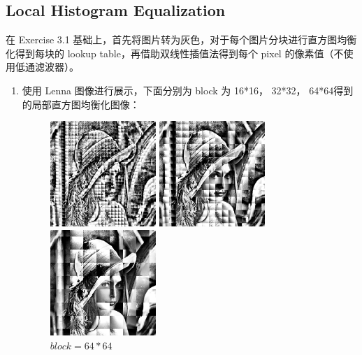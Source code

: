 \documentclass[a4paper,UTF8]{article}
\numberwithin{equation}{section}
\begin{document}
\subsection{Local Histogram Equalization}
\qquad 在 Exercise 3.1 基础上，首先将图片转为灰色，对于每个图片分块进行直方图均衡化得到每块的 lookup table，再借助双线性插值法得到每个 pixel 的像素值（不使用低通滤波器）。\par
\begin{enumerate}
	\item 使用 Lenna 图像进行展示，下面分别为 block 为 16*16， 32*32， 64*64得到的局部直方图均衡化图像：
\begin{figure}[H]
\centering
\begin{minipage}[t]{0.30\textwidth}
\centering
\includegraphics[width=4cm]{Lenna_local_16.png}
\caption{$block = 16*16$}
\label{Lenna:16_local}
\end{minipage}
\centering
\begin{minipage}[t]{0.30\textwidth}
\centering
\includegraphics[width=4cm]{Lenna_local_32.png}
\caption{$block = 32*32$}
\label{Lenna:32_local}
\end{minipage}
\centering
\begin{minipage}[t]{0.30\textwidth}
\centering
\includegraphics[width=4cm]{Lenna_local_64.png}
\caption{$block = 64*64$}

\end{minipage}
\end{figure}
\end{enumerate}
\end{document}
